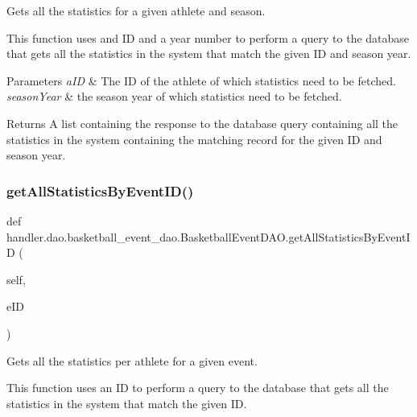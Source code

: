 Gets all the statistics for a given athlete and season. 

This function uses and ID and a year number to perform a query to the database that gets all the statistics in the system that match the given ID and season year.


\begin{DoxyParams}{Parameters}
{\em a\+ID} & The ID of the athlete of which statistics need to be fetched. \\
\hline
{\em season\+Year} & the season year of which statistics need to be fetched.\\
\hline
\end{DoxyParams}
\begin{DoxyReturn}{Returns}
A list containing the response to the database query containing all the statistics in the system containing the matching record for the given ID and season year. 
\end{DoxyReturn}
\mbox{\label{classhandler_1_1dao_1_1basketball__event__dao_1_1_basketball_event_d_a_o_a572761553d62ca0471a9d24078e81811}} 
\subsubsection{\texorpdfstring{get\+All\+Statistics\+By\+Event\+I\+D()}{getAllStatisticsByEventID()}}
{\footnotesize\ttfamily def handler.\+dao.\+basketball\+\_\+event\+\_\+dao.\+Basketball\+Event\+D\+A\+O.\+get\+All\+Statistics\+By\+Event\+ID (\begin{DoxyParamCaption}\item[{}]{self,  }\item[{}]{e\+ID }\end{DoxyParamCaption})}



Gets all the statistics per athlete for a given event. 

This function uses an ID to perform a query to the database that gets all the statistics in the system that match the given ID.


